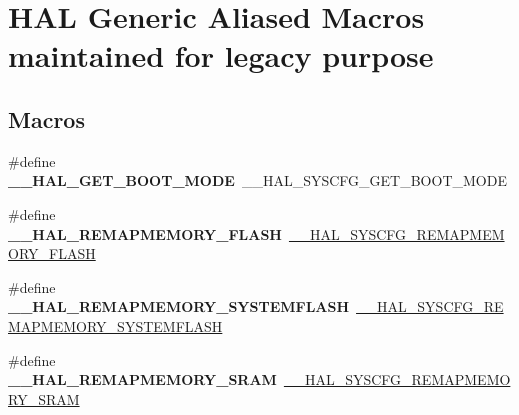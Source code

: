 \hypertarget{group___h_a_l___aliased___macros}{}\section{H\+AL Generic Aliased Macros maintained for legacy purpose}
\label{group___h_a_l___aliased___macros}
\subsection*{Macros}
\begin{DoxyCompactItemize}
\item 
\mbox{\label{group___h_a_l___aliased___macros_ga39fe1e2b6eddc3101d95ffb9f1fdfc03}} 
\#define {\bfseries \+\_\+\+\_\+\+H\+A\+L\+\_\+\+G\+E\+T\+\_\+\+B\+O\+O\+T\+\_\+\+M\+O\+DE}~\+\_\+\+\_\+\+H\+A\+L\+\_\+\+S\+Y\+S\+C\+F\+G\+\_\+\+G\+E\+T\+\_\+\+B\+O\+O\+T\+\_\+\+M\+O\+DE
\item 
\mbox{\label{group___h_a_l___aliased___macros_ga981a56c85b0612c1085c1d84cf879b35}} 
\#define {\bfseries \+\_\+\+\_\+\+H\+A\+L\+\_\+\+R\+E\+M\+A\+P\+M\+E\+M\+O\+R\+Y\+\_\+\+F\+L\+A\+SH}~\mbox{\hyperlink{group___h_a_l___exported___macros_ga9500619e1ec21659bd32b1dfecd5afc1}{\+\_\+\+\_\+\+H\+A\+L\+\_\+\+S\+Y\+S\+C\+F\+G\+\_\+\+R\+E\+M\+A\+P\+M\+E\+M\+O\+R\+Y\+\_\+\+F\+L\+A\+SH}}
\item 
\mbox{\label{group___h_a_l___aliased___macros_ga476dbd120dafe0fbe3e1e090f85d01ae}} 
\#define {\bfseries \+\_\+\+\_\+\+H\+A\+L\+\_\+\+R\+E\+M\+A\+P\+M\+E\+M\+O\+R\+Y\+\_\+\+S\+Y\+S\+T\+E\+M\+F\+L\+A\+SH}~\mbox{\hyperlink{group___h_a_l___exported___macros_ga59782d94690fd538b25def536c81c3ed}{\+\_\+\+\_\+\+H\+A\+L\+\_\+\+S\+Y\+S\+C\+F\+G\+\_\+\+R\+E\+M\+A\+P\+M\+E\+M\+O\+R\+Y\+\_\+\+S\+Y\+S\+T\+E\+M\+F\+L\+A\+SH}}
\item 
\mbox{\label{group___h_a_l___aliased___macros_ga8ac9efd3dae480b2d5d6487ddf0f1750}} 
\#define {\bfseries \+\_\+\+\_\+\+H\+A\+L\+\_\+\+R\+E\+M\+A\+P\+M\+E\+M\+O\+R\+Y\+\_\+\+S\+R\+AM}~\mbox{\hyperlink{group___h_a_l___exported___macros_ga86d36fdb1571fd56ffeecfaed80c6805}{\+\_\+\+\_\+\+H\+A\+L\+\_\+\+S\+Y\+S\+C\+F\+G\+\_\+\+R\+E\+M\+A\+P\+M\+E\+M\+O\+R\+Y\+\_\+\+S\+R\+AM}}

\end{DoxyCompactItemize}
